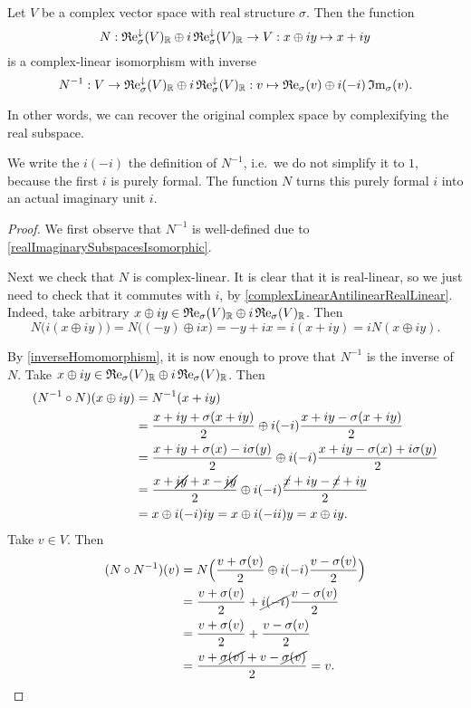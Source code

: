 \begin{proposition}
Let $V$ be a complex vector space with real structure $\sigma$. Then the function
\[ N: \operatorname{\mathfrak{R}e}_\sigma^\downarrow(V)_{\mathbb{R}}\oplus i \operatorname{\mathfrak{R}e}_\sigma^\downarrow(V)_{\mathbb{R}} \to V: x\oplus iy \mapsto x+iy \]
is a complex-linear isomorphism with inverse
\[ N^{-1}: V\to \operatorname{\mathfrak{R}e}_\sigma^\downarrow(V)_{\mathbb{R}}\oplus i \operatorname{\mathfrak{R}e}_\sigma^\downarrow(V)_{\mathbb{R}}: v \mapsto \operatorname{\mathfrak{R}e}_\sigma(v) \oplus i(-i)\operatorname{\mathfrak{I}m}_\sigma(v). \]
\end{proposition}
In other words, we can recover the original complex space by complexifying the real subspace.

We write the $i(-i)$ the definition of $N^{-1}$, i.e.\ we do not simplify it to $1$, because the first $i$ is purely formal. The function $N$ turns this purely formal $i$ into an actual imaginary unit $i$.
\begin{proof}
We first observe that $N^{-1}$ is well-defined due to \ref{realImaginarySubspacesIsomorphic}.

Next we check that $N$ is complex-linear. It is clear that it is real-linear, so we just need to check that it commutes with $i$, by \ref{complexLinearAntilinearRealLinear}. Indeed, take arbitrary $x\oplus iy\in \operatorname{\mathfrak{R}e}_\sigma(V)_{\mathbb{R}}\oplus i \operatorname{\mathfrak{R}e}_\sigma(V)_{\mathbb{R}}$. Then
\[ N\big(i(x\oplus iy)\big) = N\big((-y)\oplus ix\big) = -y+ix = i(x+iy) = iN(x\oplus iy). \]

By \ref{inverseHomomorphism}, it is now enough to prove that $N^{-1}$ is the inverse of $N$. Take $x\oplus iy \in \operatorname{\mathfrak{R}e}_\sigma(V)_{\mathbb{R}}\oplus i \operatorname{\mathfrak{R}e}_\sigma(V)_{\mathbb{R}}$. Then
\begin{align*}
(N^{-1}\circ N)(x\oplus iy) &= N^{-1}(x+iy) \\
&= \frac{x+iy + \sigma(x+iy)}{2}\oplus i(-i)\frac{x+iy - \sigma(x+iy)}{2} \\
&= \frac{x+iy + \sigma(x)-i\sigma(y)}{2}\oplus i(-i)\frac{x+iy - \sigma(x)+i\sigma(y)}{2} \\
&= \frac{x+\cancel{iy} + x-\cancel{iy}}{2}\oplus i(-i)\frac{\cancel{x}+iy - \cancel{x}+iy}{2} \\
&= x\oplus i(-i)iy = x\oplus i(-ii)y = x\oplus iy.
\end{align*}
Take $v\in V$. Then
\begin{align*}
(N\circ N^{-1})(v) &= N\Big(\frac{v+\sigma(v)}{2} \oplus i(-i)\frac{v-\sigma(v)}{2}\Big) \\
&= \frac{v+\sigma(v)}{2} + \cancel{i(-i)}\frac{v-\sigma(v)}{2} \\
&= \frac{v+\sigma(v)}{2} + \frac{v-\sigma(v)}{2} \\
&= \frac{v+\cancel{\sigma(v)}+ v - \cancel{\sigma(v)}}{2} = v.
\end{align*}
\end{proof}


